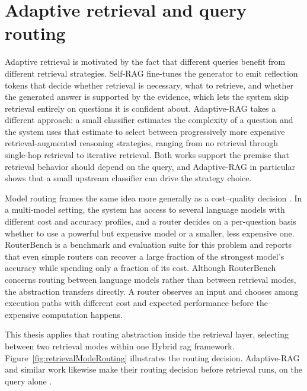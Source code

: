 \documentclass[english, bibtex]{kththesis}               %
\numberwithin{listing}{chapter}
\begin{document}
\section{Adaptive retrieval and query routing}
\label{sec:backgroundAdaptiveRetrieval}

Adaptive retrieval is motivated by the fact that different queries benefit from different retrieval strategies. Self-RAG \cite{asai2023selfrag} fine-tunes the generator to emit reflection tokens that decide whether retrieval is necessary, what to retrieve, and whether the generated answer is supported by the evidence, which lets the system skip retrieval entirely on questions it is confident about. Adaptive-RAG \cite{jeong2024adaptiverag} takes a different approach: a small classifier estimates the complexity of a question and the system uses that estimate to select between progressively more expensive retrieval-augmented reasoning strategies, ranging from no retrieval through single-hop retrieval to iterative retrieval. Both works support the premise that retrieval behavior should depend on the query, and Adaptive-RAG in particular shows that a small upstream classifier can drive the strategy choice.

Model routing frames the same idea more generally as a cost--quality decision \cite{hu2024routerbench}. In a multi-model setting, the system has access to several language models with different cost and accuracy profiles, and a router decides on a per-question basis whether to use a powerful but expensive model or a smaller, less expensive one. RouterBench \cite{hu2024routerbench} is a benchmark and evaluation suite for this problem and reports that even simple routers can recover a large fraction of the strongest model's accuracy while spending only a fraction of its cost. Although RouterBench concerns routing between language models rather than between retrieval modes, the abstraction transfers directly. A router observes an input and chooses among execution paths with different cost and expected performance before the expensive computation happens.

This thesis applies that routing abstraction inside the retrieval layer, selecting between two retrieval modes within one Hybrid \gls{rag} framework. Figure~\ref{fig:retrievalModeRouting} illustrates the routing decision. Adaptive-RAG and similar work likewise make their routing decision before retrieval runs, on the query alone \cite{jeong2024adaptiverag,hu2024routerbench}.
\end{document}
